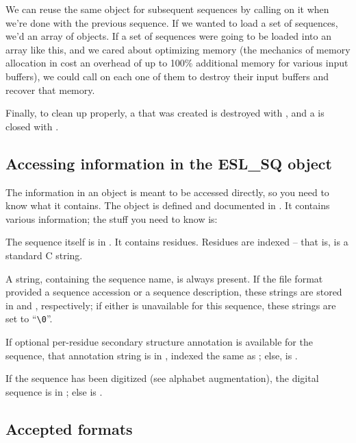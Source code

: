 We can reuse the same  object for subsequent sequences
by calling  on it when we're done with the
previous sequence. If we wanted to load a set of sequences, we'd
 an array of  objects. If a set of
sequences were going to be loaded into an array like this, and we
cared about optimizing memory (the mechanics of memory allocation in
 cost an overhead of up to 100\% additional
memory for various input buffers), we could call
 on each one of them to destroy their input
buffers and recover that memory.

Finally, to clean up properly, a  that was created is
destroyed with , and a 
is closed with .

\subsection{Accessing information in the ESL\_SQ object}

The information in an  object is meant to be accessed
directly, so you need to know what it contains. The object is defined
and documented in . It contains various information;
the stuff you need to know is:



The sequence itself is in . It contains 
residues. Residues are indexed  -- that is, 
is a standard C string. 

A  string, containing the sequence name, is always
present. If the file format provided a sequence accession or a
sequence description, these strings are stored in  and
, respectively; if either is unavailable for this
sequence, these strings are set to ``\verb+\0+''.

If optional per-residue secondary structure annotation is available
for the sequence, that annotation string is in , indexed the
same as ; else,  is .

If the sequence has been digitized (see alphabet augmentation), the
 digital sequence is in ; else  is
.

\subsection{Accepted formats}

